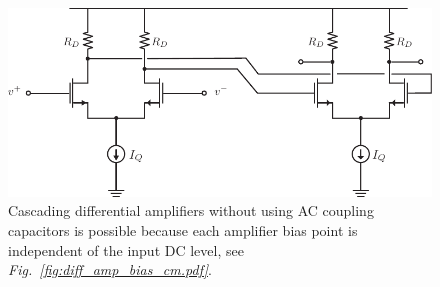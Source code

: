 \begin{figure}[tb]
\centering
\includegraphics[scale=.8]{Diff_Cascade.pdf}
\caption{Cascading differential amplifiers without using AC coupling capacitors is possible because each amplifier bias point is independent of the input DC level, see \emph{Fig.~\ref{fig:diff_amp_bias_cm.pdf}}.}
\label{fig:diff_amp_cascade}
\end{figure}
